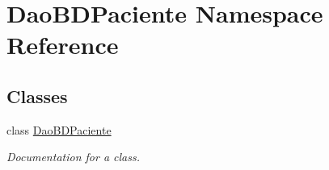 \hypertarget{namespace_dao_b_d_paciente}{}\section{Dao\+B\+D\+Paciente Namespace Reference}
\label{namespace_dao_b_d_paciente}
\subsection*{Classes}
\begin{DoxyCompactItemize}
\item 
class \mbox{\hyperlink{class_dao_b_d_paciente_1_1_dao_b_d_paciente}{Dao\+B\+D\+Paciente}}
\begin{DoxyCompactList}\small\item\em Documentation for a class. \end{DoxyCompactList}\end{DoxyCompactItemize}
